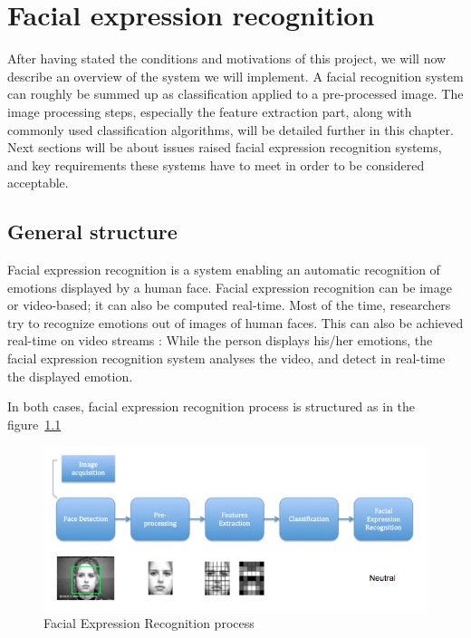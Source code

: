 \chapter{Facial expression recognition}

\noindent After having stated the conditions and motivations of this project, we will now describe an overview of the system we will implement. A facial recognition system can roughly be summed up as classification applied to a pre-processed image. The image processing steps, especially the feature extraction part, along with commonly used classification algorithms, will be detailed further in this chapter. Next sections will be about issues raised facial expression recognition systems, and key requirements these systems have to meet in order to be considered acceptable.

\section{General structure}

\vspace{\baselineskip}
\noindent Facial expression recognition is a system enabling an automatic recognition of emotions displayed by a human face. Facial expression recognition can be image or video-based; it can also be computed real-time. Most of the time, researchers try to recognize emotions out of images of human faces. This can also be achieved real-time on video streams : While the person displays his/her emotions, the facial expression recognition system analyses the video, and detect in real-time the displayed emotion.
\newline

\noindent In both cases, facial expression recognition process is structured as in the figure~\ref{facial_expression_recognition_process}
\newline

\begin{figure}[!h]
\begin{center}
\noindent \includegraphics[scale=0.6]{figures/facial_expression_recognition_process} 
\newline
\caption{Facial Expression Recognition process}
\label{facial_expression_recognition_process}
\end{center} 
\end{figure}


